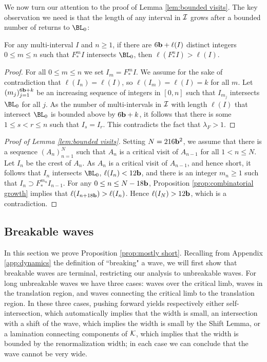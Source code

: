 \documentclass[12pt]{amsart}
\begin{document}
We now turn our attention to the proof of Lemma \ref{lem:bounded visits}. The key observation we need is that the length of any interval in $\mathcal I$ grows after a bounded number of {returns to $\BL_0$}:

\begin{prop}\label{prop:combinatorial growth}
	For any multi-interval $I$ and $n\geq 1$, if there are $6\mathbf b+\ell(I)$  distinct integers $0\leq m \leq n$ such that $F_*^mI$ intersects $\BL_0$, then $\ell(F_*^nI)> \ell(I).$
\end{prop}

\begin{proof}
	For all $0\leq m \leq n$ we set $I_m = F_*^mI$.
	We assume for the sake of contradiction that $\ell(I_n)= \ell(I)$, so $\ell(I_m)= \ell(I)=k$ for all $m$.
	Let $(m_j)_{j=1}^{6\mathbf b+k}$ be an increasing sequence of integers in $[0, n]$ such that $I_{m_j}$ intersects $\BL_0$ for all $j$.
	As the number of multi-intervals in $\mathcal I$ with length $\ell(I)$ that intersect $\BL_0$ is bounded above by $6\mathbf b+k $, 
	it follows that there is some $1\leq s < r\leq n$ such that $I_{s}= I_{r}.$ This contradicts the fact that $\lambda_F> 1$.
\end{proof}

\begin{proof}[Proof of Lemma  \ref{lem:bounded visits}]
	Setting $N = 216\mathbf b^2$, we assume that there is a sequence $(A_n)_{n=1}^N$ such that $A_n$ is a critical visit of $A_{n-1}$ for all $1< n \leq N$. Let $I_n$ 
	be the  crest of $A_n$. 
	As $A_{n}$ is a critical visit of $A_{n-1}$, and hence short, 
	it follows that $I_n$ intersects $\BL_0$, $\ell(I_n)< 12\mathbf b$,  and there is an integer $m_n\geq 1$ such that $I_n\supset F_*^{m_n}I_{n-1}$. 
	For any $0\leq n \leq N-18\mathbf b$,
	Proposition \ref{prop:combinatorial growth} implies that $\ell(I_{n+18\mathbf b}) >\ell(I_n)$. Hence
	$\ell(I_{N})> 12\mathbf b$, which is a contradiction.
\end{proof}



\subsection{Breakable waves}\label{sec:breaking}


In this section we prove Proposition \ref{prop:mostly short}. Recalling from Appendix \ref{app:dynamics} the definition of ``breaking" a wave, we will first show that breakable waves are terminal, restricting our analysis to unbreakable waves. For long unbreakable waves we have three cases: waves over the critical limb, waves in the translation region, and waves connecting the critical limb to the translation region. 
In these three cases, pushing forward yields respectively either self-intersection, which automatically implies that the width is small, an intersection with a shift of the wave, which implies the width is small by the Shift Lemma, or a lamination connecting components of $\mathcal K$, which implies that the width is bounded by the renormalization width; 
in each case we can conclude that the wave cannot be very wide.
\end{document}
